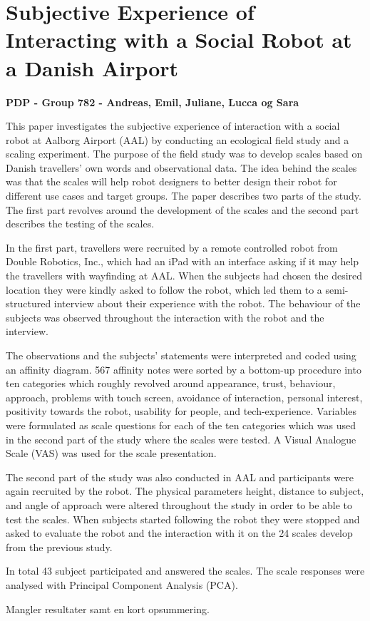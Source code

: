 


\chapter*{{\huge Subjective Experience of Interacting with a Social Robot at a Danish Airport}}
\label{ExtendedAbstract}
{\centering\textbf{{\Large PDP - Group 782 - Andreas, Emil, Juliane, Lucca og Sara}}}

This paper investigates the subjective experience of interaction with a social robot at Aalborg Airport (AAL) by conducting an ecological field study and a scaling experiment. The purpose of the field study was to develop scales based on Danish travellers' own words and observational data. The idea behind the scales was that the scales will help robot designers to better design their robot for different use cases and target groups. The paper describes two parts of the study. The first part revolves around the development of the scales and the second part describes the testing of the scales.

In the first part, travellers were recruited by a remote controlled robot from Double Robotics, Inc., which had an iPad with an interface asking if it may help the travellers with wayfinding at AAL. When the subjects had chosen the desired location they were kindly asked to follow the robot, which led them to a semi-structured interview about their experience with the robot. The behaviour of the subjects was observed throughout the interaction with the robot and the interview. 

The observations and the subjects' statements were interpreted and coded using an affinity diagram. 567 affinity notes were sorted by a bottom-up procedure into ten categories which roughly revolved around appearance, trust, behaviour, approach, problems with touch screen, avoidance of interaction, personal interest, positivity towards the robot, usability for people, and tech-experience. Variables were formulated as scale questions for each of the ten categories which was used in the second part of the study where the scales were tested. A Visual Analogue Scale (VAS) was used for the scale presentation.

The second part of the study was also conducted in AAL and participants were again recruited by the robot. The physical parameters height, distance to subject, and angle of approach were altered throughout the study in order to be able to test the scales. When subjects started following the robot they were stopped and asked to evaluate the robot and the interaction with it on the 24 scales develop from the previous study. 

In total 43 subject participated and answered the scales. The scale responses were analysed with Principal Component Analysis (PCA). 

{\color{red} Mangler resultater samt en kort opsummering.}

